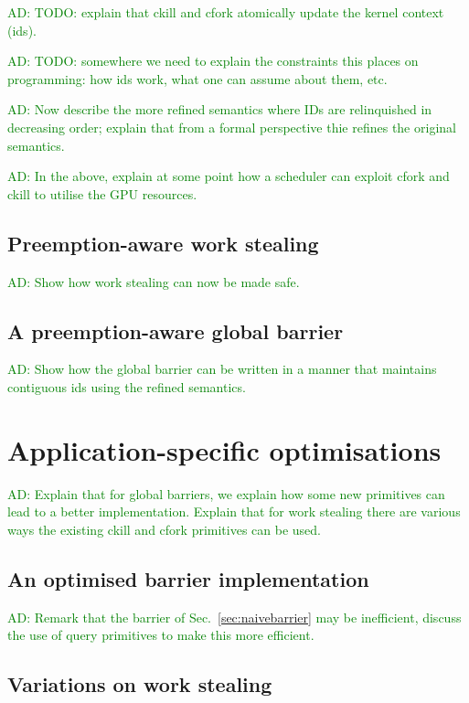 \documentclass[nocopyrightspace]{sigplanconf-pldi16}
\newcommand{\ADComment}[1]{\textcolor{green}{AD: #1}}
\newcommand{\mysec}{Sec.~}
\begin{document}
\ADComment{TODO: explain that ckill and cfork atomically update the
  kernel context (ids).}

\ADComment{TODO: somewhere we need to explain the constraints this
  places on programming: how ids work, what one can assume about them,
  etc.}

\ADComment{Now describe the more refined semantics where IDs are
  relinquished in decreasing order; explain that from a formal
  perspective thie refines the original semantics.}

\ADComment{In the above, explain at some point how a scheduler can
  exploit cfork and ckill to utilise the GPU resources.}

\subsection{Preemption-aware work stealing}

\ADComment{Show how work stealing can now be made safe.}

\subsection{A preemption-aware global barrier}

\ADComment{Show how the global barrier can be written in a manner that
  maintains contiguous ids using the refined semantics.}


\section{Application-specific optimisations}

\ADComment{Explain that for global barriers, we explain how some new
  primitives can lead to a better implementation.  Explain that for
  work stealing there are various ways the existing ckill and cfork
  primitives can be used.}

\subsection{An optimised barrier implementation}

\ADComment{Remark that the barrier of \mysec\ref{sec:naivebarrier} may
  be inefficient, discuss the use of query primitives to make this
  more efficient.}

\subsection{Variations on work stealing}
\end{document}
